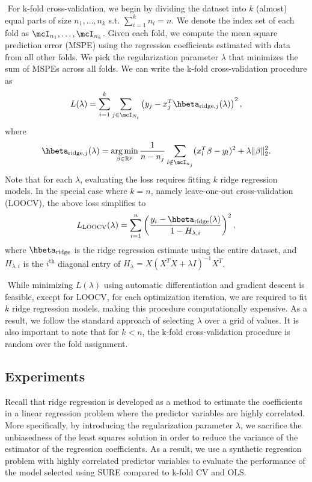$ $\newline
For k-fold cross-validation, we begin by dividing the dataset into $k$ (almost) equal parts of size $n_1,\dots, n_k$ s.t. $\sum_{i=1}^k n_i = n$. We denote the index set of each fold as $\mcI_{n_1}, \dots, \mcI_{n_k}$. Given each fold, we compute the mean square prediction error (MSPE) using the regression coefficients estimated with data from all other folds. We pick the regularization parameter $\lambda$ that minimizes the sum of MSPEs across all folds. We can write the k-fold cross-validation procedure as
\[
L(\lambda) = \sum_{i=1}^k \sum_{j \in \mcI_{N_i}} \left(y_j - x_j^T\hbeta_{\text{ridge}, j}(\lambda)\right)^2,
\] 
where
\[
\hbeta_{\text{ridge}, j}(\lambda) = \argmin_{\beta\in\reals^p} \frac{1}{n-n_j}\sum_{l\notin\mcI_{n_j}}(x_l^T\beta - y_l)^2 + \lambda \|\beta\|_2^2.
\]
Note that for each $\lambda$, evaluating the loss requires fitting $k$ ridge regression models. In the special case where $k=n$, namely leave-one-out cross-validation (LOOCV), the above loss simplifies to
\[
L_{\text{LOOCV}}(\lambda) = \sum_{i=1}^n \left( \frac{y_i - \hbeta_{\text{ridge}}(\lambda)}{1 - H_{\lambda,i}} \right)^2,
\]
where $\hbeta_{\text{ridge}}$ is the ridge regression estimate using the entire dataset, and $H_{\lambda,i}$ is the $i^\text{th}$ diagonal entry of $H_\lambda = X(X^TX + \lambda I)^{-1}X^T$.

$ $\newline
While minimizing $L(\lambda)$ using automatic differentiation and gradient descent is feasible, except for LOOCV, for each optimization iteration, we are required to fit $k$ ridge regression models, making this procedure computationally expensive. As a result, we follow the standard approach of selecting $\lambda$ over a grid of values. It is also important to note that for $k<n$, the k-fold cross-validation procedure is random over the fold assignment.

\subsection{Experiments}
Recall that ridge regression is developed as a method to estimate the coefficients in a linear regression problem where the predictor variables are highly correlated. More specifically, by introducing the regularization parameter $\lambda$, we sacrifice the unbiasedness of the least squares solution in order to reduce the variance of the estimator of the regression coefficients. As a result, we use a synthetic regression problem with highly correlated predictor variables to evaluate the performance of the model selected using SURE compared to k-fold CV and OLS.

